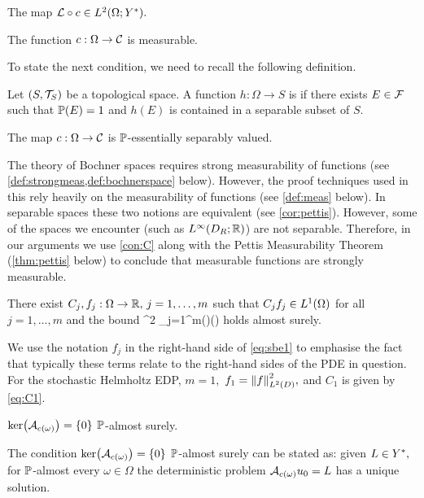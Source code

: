 \label{con:L}
The map $\rhs\circ \coeff \in \LtOYs.$
\econvar

\label{con:cborel}
 The function $c:\Omega \rightarrow \mathcal C$ is measurable.
\econvar

To state the next condition, we need to recall the following definition.

\label{def:sepval}
Let $\mleft(S,\Top{S}\mright)$ be a topological space. A function $h:\Omega\rightarrow S$ is  if there exists $E \in \mathcal F$ such that $\mathbb P(E) = 1$ and $h(E)$ is contained in a separable subset of $S$.
\ede


\label{con:C}
The map $c:\Omega\rightarrow\mathcal C$  is $\mathbb P$-essentially separably valued.
\econvar

The theory of Bochner spaces requires strong measurability of functions (see \cref{def:strongmeas,def:bochnerspace} below). However, the proof techniques used in this  rely heavily on the measurability of functions (see \cref{def:meas} below). In separable spaces these two notions are equivalent (see \cref{cor:pettis}). However, some of the spaces we encounter (such as $\LiDRRR$) are not separable. Therefore, in our arguments we use \cref{con:C} along with the Pettis Measurability Theorem (\cref{thm:pettis} below) to conclude that measurable functions are strongly measurable.
\ere

\label{con:B}
There exist $C_{j},f_{j}:\Omega\rightarrow \mathbb R, \,j=1,\ldots,m$ such that $\Cj\fj \in \LoO$ for all $j=1,\ldots,m$ and the bound
\beq \label{eq:sbe1}
^2 \leq \sum_{j=1}^m\Cj(\omega)\fj(\omega)
\eeq
holds almost surely.
\econvar

We use the notation $f_j$ in the right-hand side of \eqref{eq:sbe1} to emphasise the fact that typically these terms relate to the right-hand sides of the PDE in question. For the stochastic Helmholtz EDP, $m=1,$ $f_1 = \NLtD{f}^2,$ and $C_1$ is given by \eqref{eq:C1}.
\ere


\label{con:K}
$\ker\mleft(\Acomega\mright) = \set{0}$ $\mathbb P$-almost surely.
\econvar

The condition  $\ker\mleft(\Acomega\mright) = \set{0}$ $\mathbb P$-almost surely can be stated as: given $L \in Y^{*},$ for $\mathbb P$-almost every $\omega \in \Omega$ the deterministic problem $\Acomega \uz = L$ has a unique solution.

